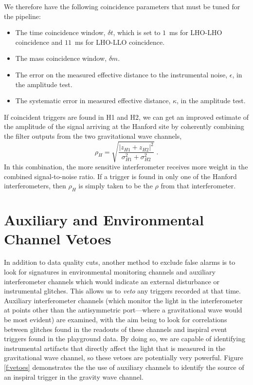 We therefore have the following coincidence parameters that must be tuned for
the pipeline:
\begin{itemize}
\item The time coincidence window, $\delta t$, which is set to $1$~ms for
LHO-LHO coincidence and $11$~ms for LHO-LLO coincidence.

\item The mass coincidence window, $\delta m$.

\item The error on the measured effective distance to the instrumental noise,
$\epsilon$, in the amplitude test.

\item The systematic error in measured effective distance, $\kappa$, in the
amplitude test.
\end{itemize}

If coincident triggers are found in H1 and H2, we can get an improved estimate
of the amplitude of the signal arriving at the Hanford site by coherently
combining the filter outputs from the two gravitational wave channels, 
\begin{equation}
\rho_H = \sqrt{ \frac{|z_{H1} + z_{H2}|^2}{\sigma_{H1}^2 +
     \sigma_{H2}^2} } \; .
\label{eq:rhoH}
\end{equation}
In this combination, the more sensitive interferometer receives more weight in
the combined signal-to-noise ratio.  If a trigger is found in only one of the
Hanford interferometers, then $\rho_H$ is simply taken to be the $\rho$ from
that interferometer.


\section{Auxiliary and Environmental Channel Vetoes}
\label{s:vetoes}

In addition to data quality cuts, another method to exclude false alarms is to
look for signatures in environmental monitoring channels and auxiliary
interferometer channels which would indicate an external disturbance or
instrumental glitches. This allows us to {\it veto} any triggers recorded at
that time.  Auxiliary interferometer channels (which monitor the light in the
interferometer at points other than the antisymmetric port---where a
gravitational wave would be most evident) are examined, with the aim being to
look for correlations between glitches found in the readouts of these channels
and inspiral event triggers found in the playground data.  By doing so, we are
capable of identifying instrumental artifacts that directly affect the light
that is measured in the gravitational wave channel, so these vetoes are
potentially very powerful. Figure \ref{f:vetoes} demonstrates the the use of
auxiliary channels to identify the source of an inspiral trigger in the
gravity wave channel.

